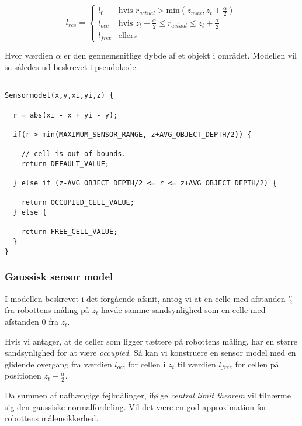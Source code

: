 $$l_{res} = \begin{cases} 
	l_0 &\text{hvis }r_{actual} > \text{min}(z_{max},z_t+\frac{\alpha}{2}) \\ 
	l_{occ} &\text{hvis } z_t-\frac{\alpha}{2} \leq r_{actual} \leq z_t+\frac{\alpha}{2}\\ 
	l_{free} &\text{ellers}  
\end{cases}$$

Hvor værdien $\alpha$ er den gennemsnitlige dybde af et objekt i området.
Modellen vil se således ud beskrevet i pseudokode.

\begin{lstlisting}[style=c, caption={Basal Sensor Model}, breaklines=true, label=mapping:sensormodel]

Sensormodel(x,y,xi,yi,z) {

  r = abs(xi - x + yi - y);  
  
  if(r > min(MAXIMUM_SENSOR_RANGE, z+AVG_OBJECT_DEPTH/2)) {
  
    // cell is out of bounds.
    return DEFAULT_VALUE;
    
  } else if (z-AVG_OBJECT_DEPTH/2 <= r <= z+AVG_OBJECT_DEPTH/2) {

    return OCCUPIED_CELL_VALUE;
  } else {    
    
  	return FREE_CELL_VALUE;
  }
}
\end{lstlisting}

\subsubsection{Gaussisk sensor model}

I modellen beskrevet i det forgående afsnit, antog vi at en celle
med afstanden $\frac{\alpha}{2}$ fra robottens måling på $z_t$ havde
samme sandsynlighed som en celle med afstanden 0 fra $z_t$.

Hvis vi antager, at de celler som ligger tættere på robottens måling,
har en større sandsynlighed for at være \emph{occupied}. 
Så kan vi konstruere en sensor model med en glidende overgang fra værdien $l_{occ}$ for 
cellen i $z_t$ til værdien $l_{free}$ for cellen på positionen $z_t \pm \frac{\alpha}{2}$. 

Da summen af uafhængige fejlmålinger, ifølge \emph{central limit theorem} vil tilnærme sig
den gaussiske normalfordeling. \cite[p. 223]{ArtificialIntelligence}
Vil det være en god approximation for robottens måleusikkerhed.


